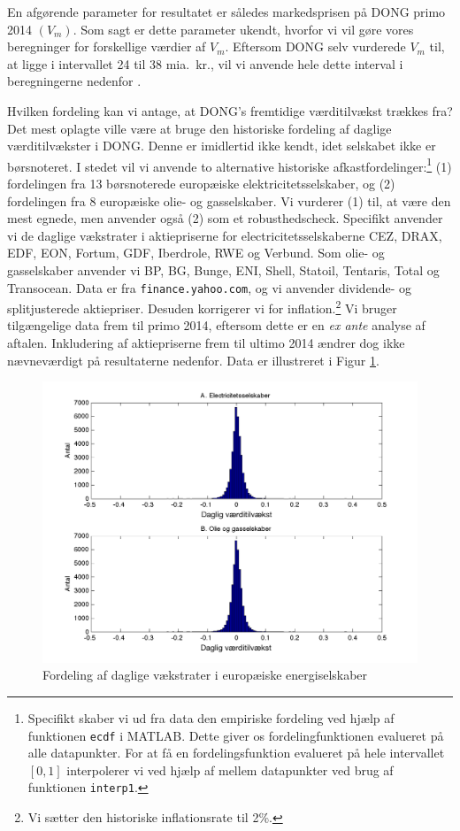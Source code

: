 \documentclass{article}
\begin{document}
En afgørende parameter for resultatet er således markedsprisen på DONG primo 2014 $(V_m)$. Som sagt er dette parameter ukendt, hvorfor vi vil gøre vores beregninger for forskellige værdier af $V_m$. Eftersom DONG selv vurderede $V_m$ til, at ligge i intervallet 24 til 38 mia.\ kr., vil vi anvende hele dette interval i beregningerne nedenfor \citep{DONG2015b}.

Hvilken fordeling kan vi antage, at DONG's fremtidige værditilvækst trækkes fra? Det mest oplagte ville være at bruge den historiske fordeling af daglige værditilvækster i DONG. Denne er imidlertid ikke kendt, idet selskabet ikke er børsnoteret. I stedet vil vi anvende to alternative historiske afkastfordelinger:\footnote{Specifikt skaber vi ud fra data den empiriske fordeling ved hjælp af funktionen \texttt{ecdf} i MATLAB. Dette giver os fordelingfunktionen evalueret på alle datapunkter. For at få en fordelingsfunktion evalueret på hele intervallet $[0,1]$ interpolerer vi ved hjælp af mellem datapunkter ved brug af funktionen \texttt{interp1}.} (1)  fordelingen fra 13 børsnoterede europæiske elektricitetsselskaber, og (2) fordelingen fra 8 europæiske olie- og gasselskaber. Vi vurderer (1) til, at være den mest egnede, men anvender også (2) som et robusthedscheck. Specifikt anvender vi de daglige vækstrater i aktiepriserne for electricitetsselskaberne CEZ, DRAX, EDF, EON, Fortum, GDF, Iberdrole, RWE og Verbund. Som olie- og gasselskaber anvender vi BP, BG, Bunge, ENI, Shell, Statoil, Tentaris, Total og Transocean. Data er fra \texttt{finance.yahoo.com}, og vi anvender dividende- og splitjusterede aktiepriser. Desuden korrigerer vi for inflation.\footnote{Vi sætter den historiske inflationsrate til 2\%.} Vi bruger tilgængelige data frem til primo 2014, eftersom dette er en \emph{ex ante} analyse af aftalen. Inkludering af aktiepriserne frem til ultimo 2014 ændrer dog ikke nævneværdigt på resultaterne nedenfor. Data er illustreret i Figur \ref{fig:data_hist}.

\begin{figure}
\caption{Fordeling af daglige v\ae{}kstrater i europ\ae{}iske energiselskaber}
\label{fig:data_hist}
\includegraphics[scale=0.8]{../matlab/figs/data_hist_guan}
\end{figure}
\end{document}
